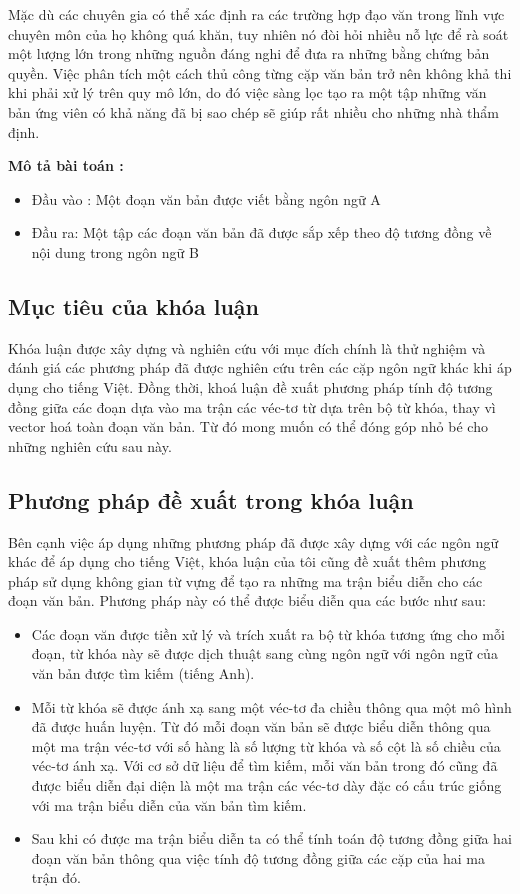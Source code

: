 \documentclass[12pt]{report}
\begin{document}
Mặc dù các chuyên gia có thể xác định ra các trường hợp đạo văn trong lĩnh vực chuyên môn của họ không quá khăn, tuy nhiên nó đòi hỏi nhiều nỗ lực để rà soát một lượng lớn trong những nguồn đáng nghi để đưa ra những bằng chứng bản quyền. Việc phân tích một cách thủ công từng cặp văn bản trở nên không khả thi khi phải xử lý trên quy mô lớn, do đó việc sàng lọc tạo ra một tập những văn bản ứng viên có khả năng đã bị sao chép sẽ giúp rất nhiều cho những nhà thẩm định.


\textbf{Mô tả bài toán :}
\begin{itemize}
	\item Đầu vào : Một đoạn văn bản được viết bằng ngôn ngữ A
	\item Đầu ra: Một tập các đoạn văn bản đã được sắp xếp theo độ tương đồng về nội dung trong ngôn ngữ B 
\end{itemize}

\subsection{Mục tiêu của khóa luận}

Khóa luận được xây dựng và nghiên cứu với mục đích chính là thử nghiệm và đánh giá các phương pháp đã được nghiên cứu trên các cặp ngôn ngữ khác khi áp dụng cho tiếng Việt. Đồng thời, khoá luận đề xuất phương pháp tính độ tương đồng giữa các đoạn dựa vào ma trận các véc-tơ từ dựa trên bộ từ khóa, thay vì vector hoá toàn đoạn văn bản. Từ đó mong muốn có thể đóng góp nhỏ bé cho những nghiên cứu sau này.

\subsection{Phương pháp đề xuất trong khóa luận}
Bên cạnh việc áp dụng những phương pháp đã được xây dựng với các ngôn ngữ khác để áp dụng cho tiếng Việt, khóa luận của tôi cũng đề xuất thêm phương pháp sử dụng không gian từ vựng để tạo ra những ma trận biểu diễn cho các đoạn văn bản. Phương pháp này có thể được biểu diễn qua các bước như sau:
\begin{itemize}
	\item Các đoạn văn được tiền xử lý và trích xuất ra bộ từ khóa tương ứng cho mỗi đoạn, từ khóa này sẽ được dịch thuật sang cùng ngôn ngữ với ngôn ngữ của văn bản được tìm kiếm (tiếng Anh).
	\item Mỗi từ khóa sẽ được ánh xạ sang một véc-tơ đa chiều thông qua một mô hình đã được huấn luyện. Từ đó mỗi đoạn văn bản sẽ được biểu diễn thông qua một ma trận véc-tơ với số hàng là số  lượng từ khóa và số cột là số chiều của véc-tơ ánh xạ. Với cơ sở dữ liệu để tìm kiếm, mỗi văn bản trong đó cũng đã được biểu diễn đại diện là một ma trận các véc-tơ dày đặc có cấu trúc giống với ma trận biểu diễn của văn bản tìm kiếm.
	\item Sau khi có được ma trận biểu diễn ta có thể tính toán độ tương đồng giữa hai đoạn văn bản thông qua việc tính độ tương  đồng giữa các cặp của hai ma trận đó.
\end{itemize}
\end{document}
